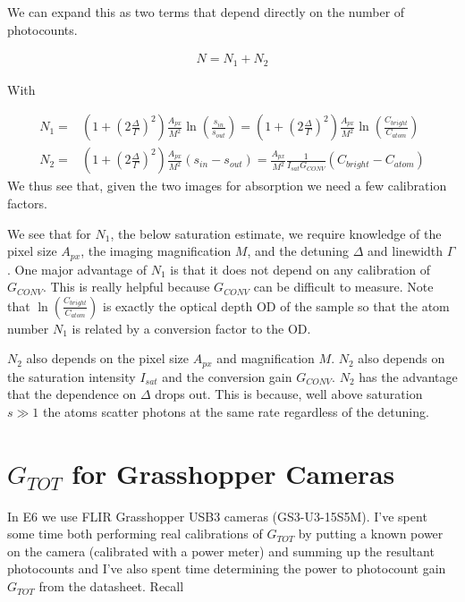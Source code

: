 \documentclass[12pt]{article}
\begin{document}
We can expand this as two terms that depend directly on the number of photocounts.

\begin{align}
N = N_1 + N_2
\end{align}

With

\begin{align}
N_1 =& \left(1 + \left(2\frac{\Delta}{\Gamma}\right)^2\right) \frac{A_{px}}{M^2} \ln \left(\frac{s_{in}}{s_{out}}\right) = \left(1 + \left(2\frac{\Delta}{\Gamma}\right)^2\right) \frac{A_{px}}{M^2} \ln \left(\frac{C_{bright}}{C_{atom}}\right)\\
N_2 =& \left(1 + \left(2\frac{\Delta}{\Gamma}\right)^2\right) \frac{A_{px}}{M^2} \left(s_{in} - s_{out}\right) = \frac{A_{px}}{M^2} \frac{1}{I_{sat} G_{CONV}}\left(C_{bright} - C_{atom}\right)
\end{align}
We thus see that, given the two images for absorption we need a few calibration factors.

We see that for $N_1$, the below saturation estimate, we require knowledge of the pixel size $A_{px}$, the imaging magnification $M$, and the detuning $\Delta$ and linewidth $\Gamma$.
One major advantage of $N_1$ is that it does not depend on any calibration of $G_{CONV}$.
This is really helpful because $G_{CONV}$ can be difficult to measure.
Note that $\ln\left(\frac{C_{bright}}{C_{atom}}\right)$ is exactly the optical depth $\text{OD}$ of the sample so that the atom number $N_1$ is related by a conversion factor to the $\text{OD}$.

$N_2$ also depends on the pixel size $A_{px}$ and magnification $M$.
$N_2$ also depends on the saturation intensity $I_{sat}$ and the conversion gain $G_{CONV}$.
$N_2$ has the advantage that the dependence on $\Delta$ drops out.
This is because, well above saturation $s\gg1$ the atoms scatter photons at the same rate regardless of the detuning.

\section{$G_{TOT}$ for Grasshopper Cameras}

In E6 we use FLIR Grasshopper USB3 cameras (GS3-U3-15S5M). 
I've spent some time both performing real calibrations of $G_{TOT}$ by putting a known power on the camera (calibrated with a power meter) and summing up the resultant photocounts and I've also spent time determining the power to photocount gain $G_{TOT}$ from the datasheet.
Recall
\end{document}
